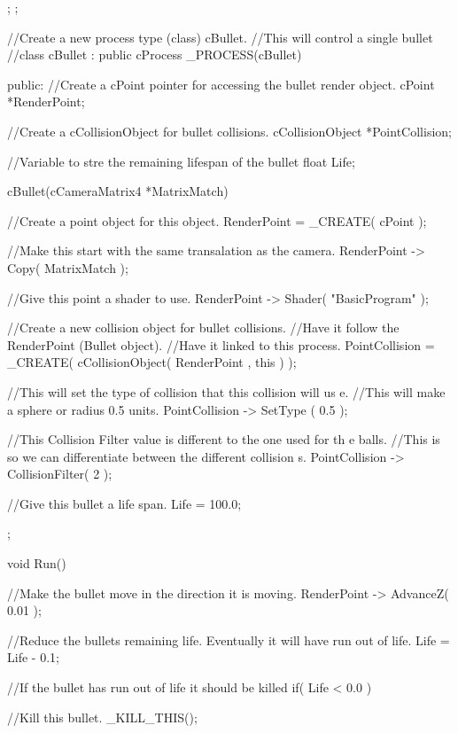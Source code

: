 \begin{DoxyCode}
{{        };
};

//Create a new process type (class) cBullet.
//This will control a single bullet
//class cBullet : public cProcess
_PROCESS(cBullet)
{
 public:
        //Create a cPoint pointer for accessing the bullet render object.
  cPoint *RenderPoint;

        //Create a cCollisionObject for bullet collisions.
  cCollisionObject *PointCollision;

   //Variable to stre the remaining lifespan of the bullet
  float Life;

   cBullet(cCameraMatrix4 *MatrixMatch)
   {
                //Create a point object for this object.
                        RenderPoint = _CREATE( cPoint );

                //Make this start with the same transalation as the camera.
                        RenderPoint -> Copy( MatrixMatch );

                //Give this point a shader to use.
                        RenderPoint -> Shader( "BasicProgram" );

                //Create a new collision object for bullet collisions.
                //Have it follow the RenderPoint (Bullet object).
                //Have it linked to this process.
                        PointCollision = _CREATE( cCollisionObject( RenderPoint ,
       this ) );

                //This will set the type of collision that this collision will us
      e.
                //This will make a sphere or radius 0.5 units.
                        PointCollision -> SetType ( 0.5 );

                //This Collision Filter value is different to the one used for th
      e balls.
                //This is so we can differentiate between the different collision
      s.
                        PointCollision -> CollisionFilter( 2 );

                //Give this bullet a life span.
                        Life = 100.0;
   };

   void Run()
   {
                //Make the bullet move in the direction it is moving.
                        RenderPoint -> AdvanceZ( 0.01 );

                //Reduce the bullets remaining life. Eventually it will have run 
      out of life.
                        Life = Life - 0.1;

                //If the bullet has run out of life it should be killed
                if( Life < 0.0 )
                {
                        //Kill this bullet.
                                _KILL_THIS();

}}}
\end{DoxyCode}
